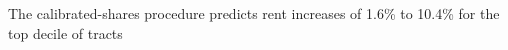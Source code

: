 The calibrated-shares procedure predicts rent increases of 1.6\% to 10.4\% for the top decile of tracts%
